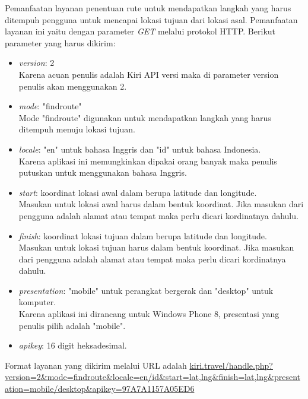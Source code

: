 \hspace{0.5cm} Pemanfaatan layanan penentuan rute untuk mendapatkan langkah yang harus ditempuh pengguna untuk mencapai lokasi tujuan dari lokasi asal. Pemanfaatan layanan ini yaitu dengan parameter \textit{GET} melalui protokol HTTP. Berikut parameter yang harus dikirim:
\begin{itemize}
	\item \textit{version}: 2 \\
	Karena acuan penulis adalah Kiri API versi maka di parameter version penulis akan menggunakan 2.
	\item \textit{mode}: "findroute" \\
	Mode "findroute" digunakan untuk mendapatkan langkah yang harus ditempuh menuju lokasi tujuan.
	\item \textit{locale}: "en" untuk bahasa Inggris dan "id" untuk bahasa Indonesia. \\
	Karena aplikasi ini memungkinkan dipakai orang banyak maka penulis putuskan untuk menggunakan bahasa Inggris.
	\item \textit{start}: koordinat lokasi awal dalam berupa latitude dan longitude. \\
	Masukan untuk lokasi awal harus dalam bentuk koordinat. Jika masukan dari pengguna adalah alamat atau tempat maka perlu dicari kordinatnya dahulu.
	\item \textit{finish}: koordinat lokasi tujuan dalam berupa latitude dan longitude. \\
	Masukan untuk lokasi tujuan harus dalam bentuk koordinat. Jika masukan dari pengguna adalah alamat atau tempat maka perlu dicari kordinatnya dahulu.
	\item \textit{presentation}: "mobile" untuk perangkat bergerak dan "desktop" untuk komputer. \\
	Karena aplikasi ini dirancang untuk Windows Phone 8, presentasi yang penulis pilih adalah "mobile".
	\item \textit{apikey}: 16 digit heksadesimal.
\end{itemize}

Format layanan yang dikirim melalui URL adalah \url{kiri.travel/handle.php?version=2&mode=findroute&locale=en/id&start=lat,lng&finish=lat,lng&presentation=mobile/desktop&apikey=97A7A1157A05ED6}

